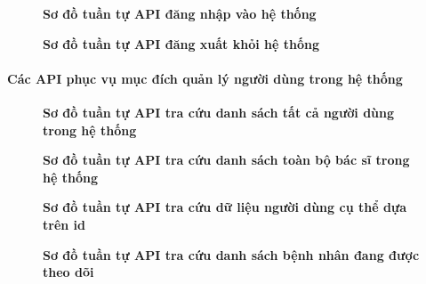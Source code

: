 \begin{figure}[H]
	\centering
	\caption[Sơ đồ tuần tự API đăng nhập vào hệ thống]{\bfseries \fontsize{12pt}{0pt}\selectfont Sơ đồ tuần tự API đăng nhập vào hệ thống}
	\label{sequence_diagram_login}
\end{figure}

\begin{figure}[H]
	\centering
	\caption[Sơ đồ tuần tự API đăng xuất khỏi hệ thống]{\bfseries \fontsize{12pt}{0pt}\selectfont Sơ đồ tuần tự API đăng xuất khỏi hệ thống}
	\label{sequence_diagram_logout}
\end{figure}

\paragraph{Các API phục vụ mục đích quản lý người dùng trong hệ thống}
\begin{figure}[H]
	\centering
	\caption[Sơ đồ tuần tự API tra cứu danh sách tất cả người dùng trong hệ thống]{\bfseries \fontsize{12pt}{0pt}\selectfont Sơ đồ tuần tự API tra cứu danh sách tất cả người dùng trong hệ thống}
	\label{sequence_diagram_get_all_users}
\end{figure}

\begin{figure}[H]
	\centering
	\caption[Sơ đồ tuần tự API tra cứu danh sách toàn bộ bác sĩ trong hệ thống]{\bfseries \fontsize{12pt}{0pt}\selectfont Sơ đồ tuần tự API tra cứu danh sách toàn bộ bác sĩ trong hệ thống}
	\label{sequence_diagram_get_all_doctors}
\end{figure}

\begin{figure}[H]
	\centering
	\caption[Sơ đồ tuần tự API tra cứu dữ liệu người dùng cụ thể dựa trên id]{\bfseries \fontsize{12pt}{0pt}\selectfont Sơ đồ tuần tự API tra cứu dữ liệu người dùng cụ thể dựa trên id}
	\label{sequence_diagram_get_user_by_id}
\end{figure}

\begin{figure}[H]
	\centering
	\caption[Sơ đồ tuần tự API tra cứu danh sách bệnh nhân đang được theo dõi]{\bfseries \fontsize{12pt}{0pt}\selectfont Sơ đồ tuần tự API tra cứu danh sách bệnh nhân đang được theo dõi}
	\label{sequence_diagram_get_patient_data}
\end{figure}

